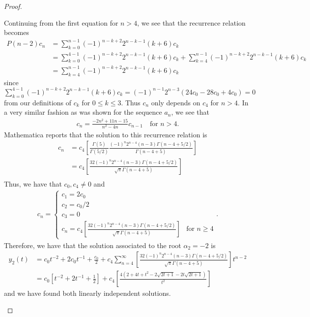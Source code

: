 \documentclass[12pt]{article}
\theoremstyle{definition}
\begin{document}
\begin{proof}
\begin{enumerate}
      Continuing from the first equation for $n>4$, we see that the recurrence relation becomes
      \begin{align*}
        P(n - 2)c_n &= \sum_{k=0}^{n-1} (-1)^{n-k+2}2^{n-k-1}(k+6)c_k \\
        &= \sum_{k=0}^{4-1} (-1)^{n-k+2}2^{n-k-1}(k+6)c_k + \sum_{k=4}^{n-1} (-1)^{n-k+2}2^{n-k-1}(k+6)c_k\\
        &= \sum_{k=4}^{n-1} (-1)^{n-k+2}2^{n-k-1}(k+6)c_k
      \end{align*}
      since $\sum_{k=0}^{4-1} (-1)^{n-k+2}2^{n-k-1}(k+6)c_k = (-1)^{n-1}2^{n-3}(24c_0 - 28c_0 + 4 c_0) = 0$ from our definitions of
      $c_k$ for $0\leq k \leq 3$. Thus $c_n$ only depends on $c_4$ for $n>4$.
      In a very similar fashion as was shown for the sequence $a_n$, we see that
      \begin{align*}
        c_n = \frac{-2n^2 +11n-15}{n^2-4n}c_{n-1} \quad \text{for $n > 4$}.
      \end{align*}
      Mathematica reports that the solution to this recurrence relation
      is
      \begin{align*}
        c_n &= c_4\left[\frac{\Gamma(5)}{\Gamma(5/2)}\frac{(-1)^n 2^{n-4}(n-3)\Gamma(n-4+5/2)}{\Gamma(n-4+5)}\right] \\
        &= c_4\left[\frac{32(-1)^n 2^{n-4}(n-3)\Gamma(n-4+5/2)}{\sqrt{\pi}\Gamma(n-4+5)}\right] \\
      \end{align*}
      Thus, we have that $c_0, c_4 \neq 0$ and
      \begin{align*}
        c_n =
        \begin{cases}
          c_1 = 2c_0& \\
          c_2 = c_0/2&\\
          c_3 = 0&\\
          c_n = c_4\left[\frac{32(-1)^n 2^{n-4}(n-3)\Gamma(n-4+5/2)}{\sqrt{\pi}\Gamma(n-4+5)}\right] & \text{for $n\geq 4$}
        \end{cases}.
      \end{align*}
      Therefore, we have that the solution associated to the root $\alpha_2 = -2$ is
      \begin{align*}
        y_2(t) &= c_0t^{-2} + 2c_0 t^{-1} + \frac{c_0}{2} + c_4\sum_{n=4}^\infty\left[\frac{32(-1)^n 2^{n-4}(n-3)\Gamma(n-4+5/2)}{\sqrt{\pi}\Gamma(n-4+5)}\right]t^{n-2} \\
        &= c_0\left[t^{-2} + 2t^{-1} + \frac{1}{2}\right] + c_4 \left[\frac{4(2+4t+t^2-2\sqrt{2t+1}-2t\sqrt{2t+1})}{t^2}\right]
      \end{align*}
      and we have found both linearly independent solutions.
  \end{enumerate}
\end{proof}
\newpage
\end{document}
